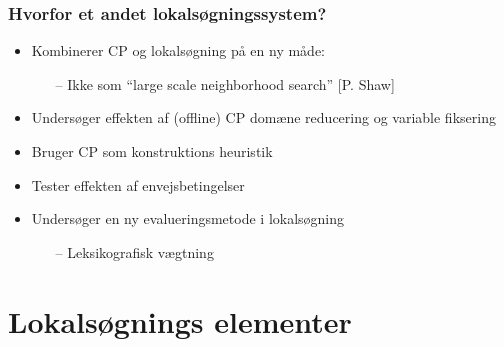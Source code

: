 \documentclass[smaller,handouts]{beamer}
\begin{document}
\begin{frame}
 \frametitle{Hvorfor et andet lokalsøgningssystem?}
 \begin{itemize}[<+->]
 \item Kombinerer CP og lokalsøgning på en ny måde: 
 \begin{itemize}[<+->]
  \item[--] Ikke som ``large scale neighborhood search'' {\scriptsize [P. Shaw] \footnotemark }
 \end{itemize}
 \item Undersøger effekten af (offline) CP domæne reducering og variable fiksering
 \item Bruger CP som konstruktions heuristik
 \item Tester effekten af envejsbetingelser
 \item \alert{Undersøger en ny evalueringsmetode i lokalsøgning}
  \begin{itemize}[<+->]
  \item[--] Leksikografisk vægtning
 \end{itemize}
 \end{itemize}
\end{frame}


\section{Lokalsøgnings elementer}
% 
%  
% 
\end{document}
